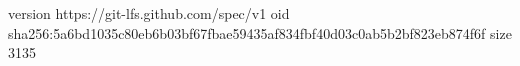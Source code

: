 version https://git-lfs.github.com/spec/v1
oid sha256:5a6bd1035c80eb6b03bf67fbae59435af834fbf40d03c0ab5b2bf823eb874f6f
size 3135
